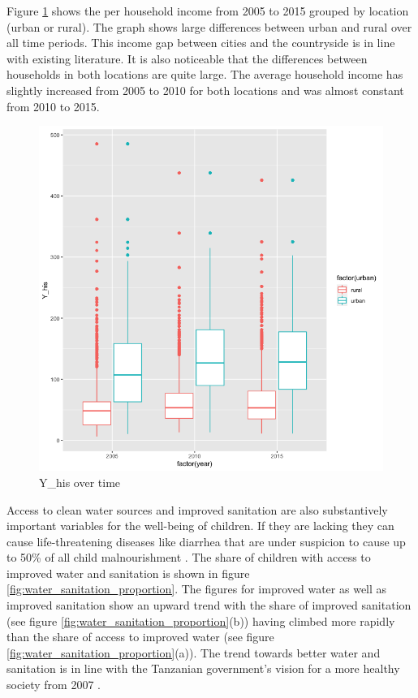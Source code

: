 \documentclass[a4paper, 11pt]{article} %
\begin{document}
Figure \ref{fig:income_over_time} shows the per household income from 2005 to 2015 grouped by location (urban or rural). The graph shows large differences between urban and rural over all time periods. This income gap between cities and the countryside is in line with existing literature. It is also noticeable that the differences between households in both locations are quite large. The average household income has slightly increased from 2005 to 2010 for both locations and was almost constant from 2010 to 2015. \\

\begin{figure}[h!]
    \centering
    \includegraphics[scale=0.45]{figures/income_over_time} 
    \caption{Y\_his over time}
    \label{fig:income_over_time}
\end{figure}

Access to clean water sources and improved sanitation are also substantively important variables for the well-being of children. If they are lacking they can cause life-threatening diseases like diarrhea that are under suspicion to cause up to 50\% of all child malnourishment \cite{UNI18}. The share of children with access to improved water and sanitation is shown in figure \ref{fig:water_sanitation_proportion}. The figures for improved water as well as improved sanitation show an upward trend with the share of improved sanitation (see figure \ref{fig:water_sanitation_proportion}(b)) having climbed more rapidly than the share of access to improved water (see figure \ref{fig:water_sanitation_proportion}(a)). The trend towards better water and sanitation is in line with the Tanzanian government's vision for a more healthy society from 2007 \cite{Health2016Dec}. \\
\end{document}

